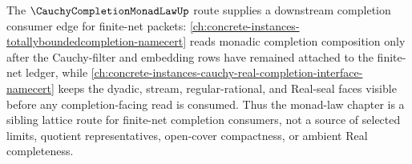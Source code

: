 The $\CauchyCompletionMonadLawUp$ route supplies a downstream completion consumer edge for finite-net packets: \autoref{ch:concrete-instances-totallyboundedcompletion-namecert} reads monadic completion composition only after the Cauchy-filter and embedding rows have remained attached to the finite-net ledger, while \autoref{ch:concrete-instances-cauchy-real-completion-interface-namecert} keeps the dyadic, stream, regular-rational, and Real-seal faces visible before any completion-facing read is consumed. Thus the monad-law chapter is a sibling lattice route for finite-net completion consumers, not a source of selected limits, quotient representatives, open-cover compactness, or ambient Real completeness.
